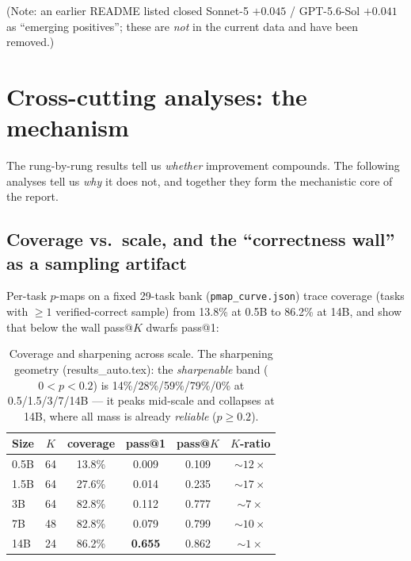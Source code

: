 \noindent (Note: an earlier README listed closed Sonnet-5 $+0.045$ / GPT-5.6-Sol $+0.041$ as ``emerging
positives''; these are \emph{not} in the current data and have been removed.)

\section{Cross-cutting analyses: the mechanism}
The rung-by-rung results tell us \emph{whether} improvement compounds. The following analyses tell us
\emph{why} it does not, and together they form the mechanistic core of the report.

\subsection{Coverage vs.\ scale, and the ``correctness wall'' as a sampling artifact}
Per-task $p$-maps on a fixed 29-task bank (\texttt{pmap\_curve.json}) trace coverage (tasks with $\ge1$
verified-correct sample) from 13.8\% at 0.5B to 86.2\% at 14B, and show that below the wall pass@$K$ dwarfs
pass@1:

\begin{table}[H]\centering\small
\begin{tabular}{lccccc}
\toprule
Size & $K$ & coverage & pass@1 & pass@$K$ & $K$-ratio \\
\midrule
0.5B & 64 & 13.8\% & 0.009 & 0.109 & ${\sim}12\times$ \\
1.5B & 64 & 27.6\% & 0.014 & 0.235 & ${\sim}17\times$ \\
3B   & 64 & 82.8\% & 0.112 & 0.777 & ${\sim}7\times$ \\
7B   & 48 & 82.8\% & 0.079 & 0.799 & ${\sim}10\times$ \\
14B  & 24 & 86.2\% & \textbf{0.655} & 0.862 & ${\sim}1\times$ \\
\bottomrule
\end{tabular}
\caption{Coverage and sharpening across scale. The sharpening geometry (results\_auto.tex): the
\emph{sharpenable} band ($0{<}p{<}0.2$) is 14\%/28\%/59\%/79\%/0\% at 0.5/1.5/3/7/14B --- it peaks mid-scale
and collapses at 14B, where all mass is already \emph{reliable} ($p\ge0.2$).}
\end{table}


